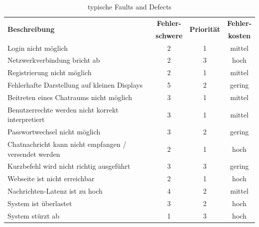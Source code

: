 \begin{table}[H]
  \centering
    \begin{tabular}{l|c|c|c}
        \multirow{2}{*}{\textbf{Beschreibung}}                & \textbf{Fehler-} & \multirow{2}{*}{\textbf{Priorität}} & \textbf{Fehler-} \\
                                                              & \textbf{schwere} &                                     & \textbf{kosten}  \\ \hline
        Login nicht möglich                                   & 2             & 1         & mittel       \\ \hline
        Netzwerkverbindung bricht ab                          & 2             & 3         & hoch         \\ \hline
        Registrierung nicht möglich                           & 2             & 1         & mittel       \\ \hline
        Fehlerhafte Darstellung auf kleinen Displays          & 5             & 2         & gering       \\ \hline
        Beitreten eines Chatraums nicht möglich               & 3             & 1         & mittel       \\ \hline
        Benutzerrechte werden nicht korrekt interpretiert     & 3             & 1         & mittel       \\ \hline
        Passwortwechsel nicht möglich                         & 3             & 2         & gering       \\ \hline
        Chatnachricht kann nicht empfangen / versendet werden & 2             & 1         & hoch         \\ \hline
        Kurzbefehl wird nicht richtig ausgeführt              & 3             & 3         & gering       \\ \hline
        Webseite ist nicht erreichbar                         & 2             & 1         & hoch         \\ \hline
        Nachrichten-Latenz ist zu hoch                        & 4             & 2         & mittel       \\ \hline
        System ist überlastet                                 & 3             & 2         & hoch         \\ \hline
        System stürzt ab                                      & 1             & 3         & hoch        
    \end{tabular}
    \caption{typische Faults and Defects}
    \label{tab:FaultsAndDeffects}
\end{table}



